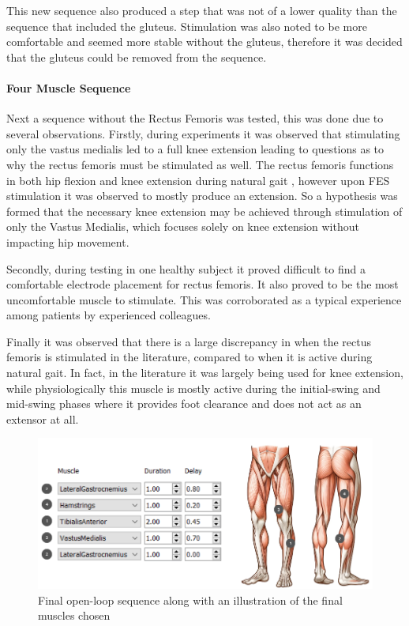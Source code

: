 This new sequence also produced a step that was not of a lower quality than the sequence that included the gluteus. Stimulation was also noted to be more comfortable and seemed more stable without the gluteus, therefore it was decided that the gluteus could be removed from the sequence.

\paragraph*{Four Muscle Sequence}
Next a sequence without the Rectus Femoris was tested, this was done due to several observations. Firstly, during experiments it was observed that stimulating only the vastus medialis led to a full knee extension leading to questions as to why the rectus femoris must be stimulated as well. The rectus femoris functions in both hip flexion and knee extension during natural gait , however upon FES stimulation it was observed to mostly produce an extension. So a hypothesis was formed that the necessary knee extension may be achieved through stimulation of only the Vastus Medialis, which focuses solely on knee extension without impacting hip movement. 

Secondly, during testing in one healthy subject it proved difficult to find a comfortable electrode placement for rectus femoris. It also proved to be the most uncomfortable muscle to stimulate. This was corroborated as a typical experience among patients by experienced colleagues. 

Finally it was observed that there is a large discrepancy in when the rectus femoris is stimulated in the literature, compared to when it is active during natural gait. In fact, in the literature it was largely being used for knee extension, while physiologically this muscle is mostly active during the initial-swing and mid-swing phases where it provides foot clearance and does not act as an extensor at all. 

\begin{figure} [h]
    \centering
    \includegraphics[width=0.99\linewidth]{images/final_seq_w_muscles.png}
    \caption{Final open-loop sequence along with an illustration of the final muscles chosen}
    \label{fig:fianlsequence}
\end{figure}


